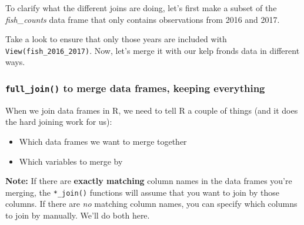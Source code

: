 \documentclass[]{book}
\newenvironment{Shaded}{\begin{snugshade}}{\end{snugshade}}
\newcommand{\CommentTok}[1]{\textcolor[rgb]{0.56,0.35,0.01}{\textit{#1}}}
\newcommand{\DataTypeTok}[1]{\textcolor[rgb]{0.13,0.29,0.53}{#1}}
\newcommand{\DecValTok}[1]{\textcolor[rgb]{0.00,0.00,0.81}{#1}}
\newcommand{\KeywordTok}[1]{\textcolor[rgb]{0.13,0.29,0.53}{\textbf{#1}}}
\newcommand{\NormalTok}[1]{#1}
\newcommand{\OperatorTok}[1]{\textcolor[rgb]{0.81,0.36,0.00}{\textbf{#1}}}
\newcommand{\StringTok}[1]{\textcolor[rgb]{0.31,0.60,0.02}{#1}}
\providecommand{\tightlist}{%
  \setlength{\itemsep}{0pt}\setlength{\parskip}{0pt}}
\begin{document}
To clarify what the different joins are doing, let's first make a subset of the \emph{fish\_counts} data frame that only contains observations from 2016 and 2017.

\begin{Shaded}
\end{Shaded}

Take a look to ensure that only those years are included with \texttt{View(fish\_2016\_2017)}. Now, let's merge it with our kelp fronds data in different ways.

\hypertarget{full_join-to-merge-data-frames-keeping-everything}{%
\subsubsection{\texorpdfstring{\texttt{full\_join()} to merge data frames, keeping everything}{full\_join() to merge data frames, keeping everything}}\label{full_join-to-merge-data-frames-keeping-everything}}

When we join data frames in R, we need to tell R a couple of things (and it does the hard joining work for us):

\begin{itemize}
\tightlist
\item
  Which data frames we want to merge together
\item
  Which variables to merge by
\end{itemize}

\textbf{Note:} If there are \textbf{exactly matching} column names in the data frames you're merging, the \texttt{*\_join()} functions will assume that you want to join by those columns. If there are \emph{no} matching column names, you can specify which columns to join by manually. We'll do both here.

\begin{Shaded}
\end{Shaded}
\end{document}
